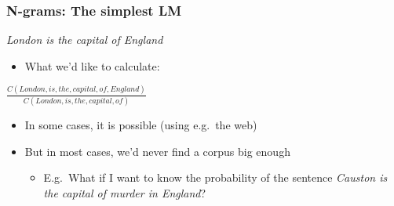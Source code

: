 \documentclass{beamer}
\begin{document}
\begin{frame}
\frametitle{N-grams: The simplest LM}
{\it London is the capital of England}

\vspace{0.3cm}

\begin{itemize}
\item What we'd like to calculate:
\end{itemize}
\begin{center}
	$\frac{C(London,is,the,capital,of,England)}{C(London,is,the,capital,of)}$




\end{center}
\begin{itemize}
\item In some cases, it is possible (using e.g.\ the web)
\item But in most cases, we'd never find a corpus big enough
\begin{itemize}
\item E.g.\ What if I want to know the probability of the sentence {\it Causton is the capital of murder in England}?
\end{itemize}
\end{itemize}
\end{frame}




    
\end{document}
